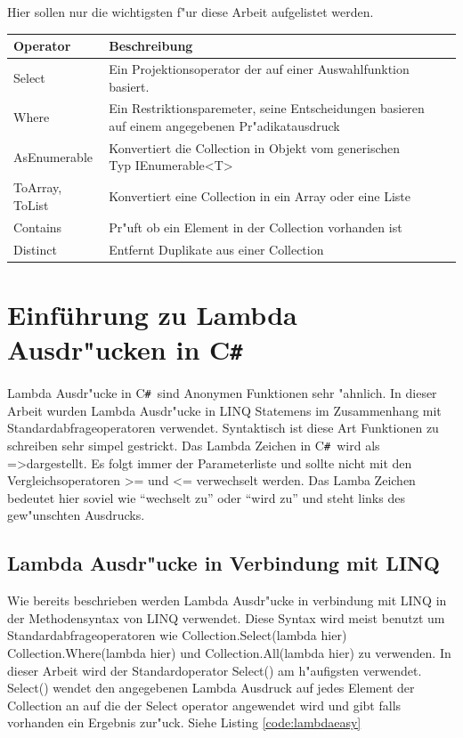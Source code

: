 \documentclass[pagesize, paper=a4, fontsize=12pt,titlepage=true, headings=small, headnosepline, abstractoff, liststotoc, nochapterprefix, plainheadsepline]{scrreprt}
\newcommand{\CS}{C\texttt{\#}}
\newcommand{\CSS}{C\texttt{\# }}
\newcommand{\LAM}{ =\textgreater\space}
\begin{document}
Hier sollen nur die wichtigsten f"ur diese Arbeit aufgelistet werden.

\label{tab:standardoperatoren}
\begin{tabular}{p{3cm}|p{9cm} |l|l|}
\hline
  Operator & Beschreibung\\
\hline
\hline
  Select & Ein Projektionsoperator der auf einer Auswahlfunktion basiert.\\
\hline
  Where & Ein Restriktionsparemeter, seine Entscheidungen basieren auf einem angegebenen
 Pr"adikatausdruck\\
\hline
AsEnumerable & Konvertiert die Collection in Objekt vom generischen Typ IEnumerable<T>\\
\hline
ToArray, ToList & Konvertiert eine Collection in ein Array oder eine Liste\\
\hline
Contains & Pr"uft ob ein Element in der Collection vorhanden ist\\
\hline
Distinct & Entfernt Duplikate aus einer Collection \\
\hline
\end{tabular}

\newpage
	\section {Einführung zu Lambda Ausdr"ucken in \CS}
		Lambda Ausdr"ucke in \CSS sind Anonymen Funktionen sehr "ahnlich. In dieser Arbeit wurden Lambda Ausdr"ucke in LINQ Statemens im Zusammenhang mit Standardabfrageoperatoren verwendet. Syntaktisch ist diese Art Funktionen zu schreiben sehr simpel gestrickt. Das Lambda Zeichen in \CSS wird als \LAM dargestellt. Es folgt immer der Parameterliste und sollte nicht mit den Vergleichsoperatoren \textgreater = und \textless = verwechselt werden. Das Lamba Zeichen bedeutet hier soviel wie "`wechselt zu"' oder "`wird zu"' und steht links des gew"unschten Ausdrucks.
		\subsection {Lambda Ausdr"ucke in Verbindung mit LINQ}
Wie bereits beschrieben werden Lambda Ausdr"ucke  in verbindung mit LINQ in der Methodensyntax von LINQ verwendet. Diese Syntax wird meist benutzt um Standardabfrageoperatoren wie Collection.Select(lambda hier) Collection.Where(lambda hier) und Collection.All(lambda hier) zu verwenden. In dieser Arbeit wird der Standardoperator Select() am h"aufigsten verwendet. Select() wendet den angegebenen Lambda Ausdruck auf jedes Element der Collection an auf die der Select operator angewendet wird und gibt falls vorhanden ein Ergebnis zur"uck. Siehe Listing \ref{code:lambdaeasy}
\end{document}
